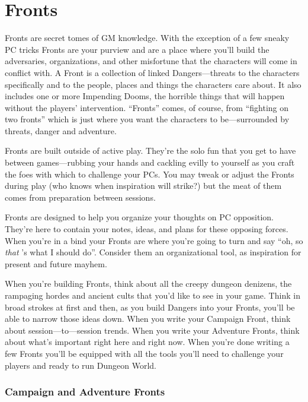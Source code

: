 \chapter{Fronts}
  
            

Fronts are secret tomes of GM knowledge. With the exception of a few sneaky PC tricks Fronts are your purview and are a place where you’ll build the adversaries, organizations, and other misfortune that the characters will come in conflict with. A Front is a collection of linked Dangers—threats to the characters specifically and to the people, places and things the characters care about. It also includes one or more Impending Dooms, the horrible things that will happen without the players' intervention. “Fronts” comes, of course, from “fighting on two fronts” which is just where you want the characters to be—surrounded by threats, danger and adventure.

       

Fronts are built outside of active play. They’re the solo fun that you get to have between games—rubbing your hands and cackling evilly to yourself as you craft the foes with which to challenge your PCs. You may tweak or adjust the Fronts during play (who knows when inspiration will strike?) but the meat of them comes from preparation between sessions.

       

Fronts are designed to help you organize your thoughts on PC opposition. They’re here to contain your notes, ideas, and plans for these opposing forces. When you’re in a bind your Fronts are where you’re going to turn and say “oh, so {\em that} ’s what I should do”. Consider them an organizational tool, as inspiration for present and future mayhem.

       

When you’re building Fronts, think about all the creepy dungeon denizens, the rampaging hordes and ancient cults that you’d like to see in your game. Think in broad strokes at first and then, as you build Dangers into your Fronts, you’ll be able to narrow those ideas down. When you write your Campaign Front, think about session—to—session trends. When you write your Adventure Fronts, think about what’s important right here and right now. When you’re done writing a few Fronts you’ll be equipped with all the tools you’ll need to challenge your players and ready to run Dungeon World.

       
\subsection{Campaign and Adventure Fronts}     
       

